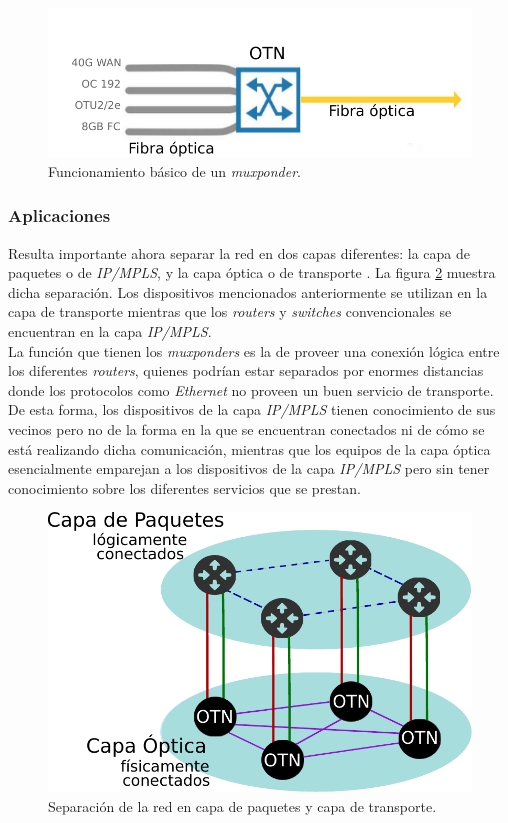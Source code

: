   \begin{figure}[htbp]
	\centering
	\includegraphics[scale=0.8]{Figures/muxponder.pdf}
	\caption{Funcionamiento básico de un \textit{muxponder}.}
	\label{fig:muxponder}
  \end{figure}

  \subsubsection{Aplicaciones}
  Resulta importante ahora separar la red en dos capas diferentes: la capa de paquetes o de \textit{IP/MPLS}, y la capa óptica o de transporte \parencite{capasredess}. La figura \ref{fig:capasredes} muestra dicha separación.  Los dispositivos mencionados anteriormente se utilizan en la capa de transporte mientras que los \textit{routers} y \textit{switches} convencionales se encuentran en la capa \textit{IP/MPLS}.
  \\

La función que tienen los \textit{muxponders} es la de proveer una conexión lógica entre los diferentes \textit{routers}, quienes podrían estar separados por enormes distancias donde los protocolos como \textit{Ethernet} no proveen un buen servicio de transporte. 
\\

De esta forma, los dispositivos de la capa \textit{IP/MPLS} tienen conocimiento de sus vecinos pero no de la forma en la que se encuentran conectados ni de cómo se está realizando dicha comunicación, mientras que los equipos de la capa óptica esencialmente emparejan a los dispositivos de la capa \textit{IP/MPLS} pero sin tener conocimiento sobre los diferentes servicios que se prestan. 
\\

\begin{figure}[htbp]
	\centering
	\includegraphics[scale=0.7]{Figures/capasredes.pdf}
	\caption{Separación de la red en capa de paquetes y capa de transporte.}
	\label{fig:capasredes}
  \end{figure}